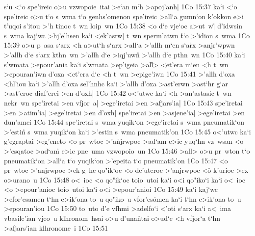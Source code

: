 s`u
<`o
spe'ireic
o>u
vzwopoie~itai
>e`an
m`h
>apoj'anh|\bibvsend
\vs 1Co 15:37
ka`i
<`o
spe'ireic
o>u
t`o
s~wma
t`o
genhs'omenon
spe'ireic
>all`a
gumn`on
k'okkon
e>i
t'uqoi
s'itou
>'h
tinoc
t~wn
loip~wn\bibvsend
\vs 1Co 15:38
<o
d`e
vje`oc
a>ut~w|\r{}
d'idwsin
s~wma
kaj`wc
>hj'elhsen
ka`i
<ek'astw|
t~wn
sperm'atwn
\r{t}`o
>'idion
s~wma\bibvsend
\vs 1Co 15:39
o>u
p~asa
s`arx
<h
a>ut`h
s`arx
>all`a
>'allh
m`en
s`a\r{r}x
>anjr'wpwn
>'allh
d`e
s`arx
kthn~wn
>'allh
d`e
>iqj'uwn\r{}
>'allh
d`e
pthn~wn\bibvsend
\vs 1Co 15:40
ka`i
s'wmata
>epour'ania
ka`i
s'wmata
>ep'igeia
>al\r{l}>
<et'era
m`en
<h
t~wn
>epouran'iwn
d'oxa
<et'era
d`e
<h
t~wn
>epige'iwn\bibvsend
\vs 1Co 15:41
>'allh
d'oxa
<hl'iou
ka`i
>'allh
d'oxa
sel'hnhc
ka`i
>'allh
d'oxa
>ast'erwn
>ast`hr
g`ar
>ast'eroc
diaf'erei
>en
d'oxh|\bibvsend
\vs 1Co 15:42
o<'utwc
ka`i
<h
>an'astasic
t~wn
nekr~wn
spe'iretai
>en
vfjor~a|
>ege'iretai
>en
>afjars'ia|\bibvsend
\vs 1Co 15:43
spe'iretai
>en
>atim'ia|
>ege'iretai
>en
d'oxh|
spe'iretai
>en
>asjene'ia|
>ege'iretai
>en
dun'amei\bibvsend
\vs 1Co 15:44
spe'iretai
s~wma
yuqik`on
>ege'iretai
s~wma
pneumatik`on
>'estin\r{}
s~wma
yuqik`on
ka`i
>'estin
s~wma
pneumatik'on\bibvsend
\vs 1Co 15:45
o<'utwc
ka`i
g'egraptai
>eg'eneto
<o
pr~wtoc
>'a\r{n}jrwpoc
>ad`am
e>ic
yuq`hn
vz~wsan
<o
>'esqatoc
>ad`a\r{m}
e>ic
pne~uma
vzwopoio~un\bibvsend
\vs 1Co 15:46
>all>
o>u
pr~wton
t`o
pneumatik`on
>all`a
t`o
yuqik`on
>'epeita
t`o
pneumatik'on\bibvsend
\vs 1Co 15:47
<o
pr~wtoc
>'anjrwpoc
>ek
g~hc
qo"ik`oc
<o
de'uteroc
>'anjrwpoc
<o\r{}
k'urioc
>ex
o>urano~u\bibvsend
\vs 1Co 15:48
o<~ioc
<o
qo"ik`oc
toio~utoi
ka`i
o<i
qo"iko`i
ka`i
o<~ioc
<o
>epour'anioc
toio~utoi
ka`i
o<i
>epour'anioi\bibvsend
\vs 1Co 15:49
ka`i
kaj`wc
>efor'esamen
t`hn
e>ik'ona
to~u
qo"iko~u
vfor'es\r{o}men
ka`i
t`hn
e>ik'ona
to~u
>epouran'iou\bibvsend
\vs 1Co 15:50
to~uto
d'e
vfhmi
>adelfo`i
<'oti
s`arx
ka`i
a<~ima
vbasile'ian
vjeo~u
klhronom~hsai
o>u
d'una\r{n}tai
o>ud`e
<h
vfjor`a
t`hn
>afjars'ian
klhronome~i\bibvsend
\vs 1Co 15:51
